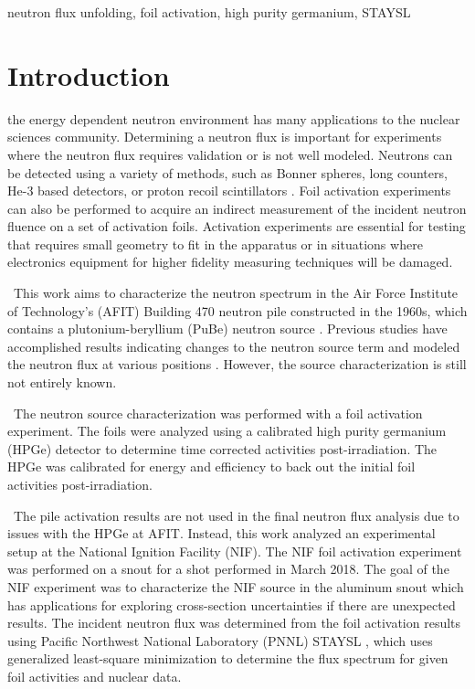 \documentclass[journal]{IEEEtran}
\begin{document}
	\begin{IEEEkeywords}
		neutron flux unfolding, foil activation, high purity germanium, STAYSL 
	\end{IEEEkeywords}
	
	\IEEEpeerreviewmaketitle
	
	\section{Introduction}
	 the energy dependent neutron environment has many applications to the nuclear sciences community. 
Determining a neutron flux is important for experiments where the neutron flux requires validation or is not well modeled. 
Neutrons can be detected using a variety of methods, such as Bonner spheres, long counters, He-3 based detectors, or proton recoil scintillators \cite{Knoll}. 
Foil activation experiments can also be performed to acquire an indirect measurement of the incident neutron fluence on a set of activation foils. 
Activation experiments are essential for testing that requires small geometry to fit in the apparatus or in situations where electronics equipment for higher fidelity measuring techniques will be damaged. 
	
	\ This work aims to characterize the neutron spectrum in the Air Force Institute of Technology's (AFIT) Building 470 neutron pile constructed in the 1960s, which contains a plutonium-beryllium (PuBe) neutron source \cite{NETF}. 
Previous studies have accomplished results indicating changes to the neutron source term and modeled the neutron flux at various positions \cite{Bevins,Will}. 
However, the source characterization is still not entirely known. 
	
	\ The neutron source characterization was performed with a foil activation experiment. 
The foils were analyzed using a calibrated high purity germanium (HPGe) detector to determine time corrected activities post-irradiation. 
The HPGe was calibrated for energy and efficiency to back out the initial foil activities post-irradiation. 
	
	\ The pile activation results are not used in the final neutron flux analysis due to issues with the HPGe at AFIT. 
Instead, this work analyzed an experimental setup at the National Ignition Facility (NIF). 
The NIF foil activation experiment was performed on a snout for a shot performed in March 2018\cite{Bogetic}. 
The goal of the NIF experiment was to characterize the NIF source in the aluminum snout which has applications for exploring cross-section uncertainties if there are unexpected results. 
The incident neutron flux was determined from the foil activation results using Pacific Northwest National Laboratory (PNNL) STAYSL %
, which uses generalized least-square minimization to determine the flux spectrum for given foil activities and nuclear data.
\end{document}
